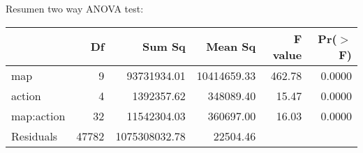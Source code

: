 \documentclass[10pt,a4paper]{article}
\begin{document}
Resumen two way ANOVA test:
\begin{table}[ht]
\centering
\begin{tabular}{lrrrrr}
  \hline
 & Df & Sum Sq & Mean Sq & F value & Pr($>$F) \\ 
  \hline
map         & 9 & 93731934.01 & 10414659.33 & 462.78 & 0.0000 \\ %
  action      & 4 & 1392357.62 & 348089.40 & 15.47 & 0.0000 \\ %
  map:action  & 32 & 11542304.03 & 360697.00 & 16.03 & 0.0000 \\ %
  Residuals   & 47782 & 1075308032.78 & 22504.46 &  &  \\ 
   \hline
\end{tabular}
\end{table}

\end{document}
